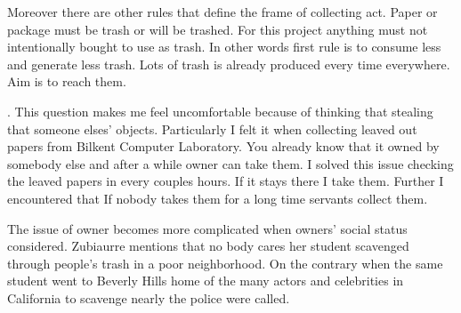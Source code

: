 



Moreover there are other rules that define the frame of collecting act. Paper or package must be trash or will be trashed. For this project anything must not intentionally bought to use as trash. In other words first rule is to consume less and generate less trash. Lots of trash is already produced every time everywhere. Aim is to reach them.

 \cite{zimring2012encyclopedia}. This question makes me feel uncomfortable because of thinking that stealing that someone elses' objects. Particularly I felt it when collecting leaved out papers from Bilkent Computer Laboratory. You already know that it owned by somebody else and after a while owner can take them. I solved this issue checking the leaved papers in every couples hours. If it stays there I take them. Further I encountered that If nobody takes them for a long time servants collect them.

The issue of owner becomes more complicated when owners' social status considered. Zubiaurre mentions that no body cares her student scavenged through people’s trash in a poor neighborhood. On the contrary when the same student went to Beverly Hills home of the many actors and celebrities in California to scavenge nearly the police were called.

